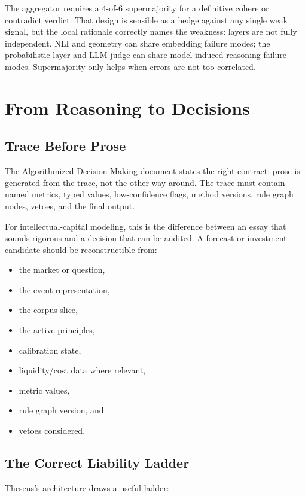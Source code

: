 \documentclass[11pt]{article}
\begin{document}
The aggregator requires a 4-of-6 supermajority for a definitive cohere or
contradict verdict. That design is sensible as a hedge against any single weak
signal, but the local rationale correctly names the weakness: layers are not
fully independent. NLI and geometry can share embedding failure modes; the
probabilistic layer and LLM judge can share model-induced reasoning failure
modes. Supermajority only helps when errors are not too correlated.

\section{From Reasoning to Decisions}

\subsection{Trace Before Prose}

The Algorithmized Decision Making document states the right contract: prose is
generated from the trace, not the other way around. The trace must contain named
metrics, typed values, low-confidence flags, method versions, rule graph nodes,
vetoes, and the final output.

For intellectual-capital modeling, this is the difference between an essay that
sounds rigorous and a decision that can be audited. A forecast or investment
candidate should be reconstructible from:

\begin{itemize}
\item the market or question,
\item the event representation,
\item the corpus slice,
\item the active principles,
\item calibration state,
\item liquidity/cost data where relevant,
\item metric values,
\item rule graph version, and
\item vetoes considered.
\end{itemize}

\subsection{The Correct Liability Ladder}

Theseus's architecture draws a useful ladder:
\end{document}
